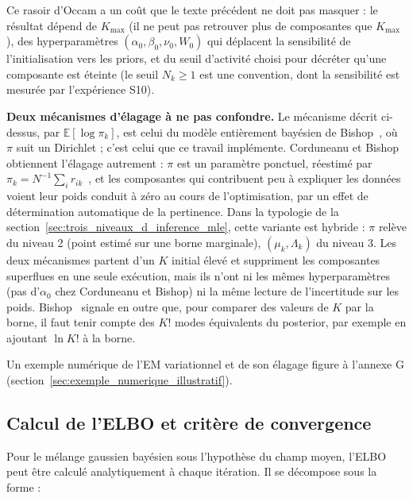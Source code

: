 Ce rasoir d'Occam a un coût que le texte précédent ne doit pas masquer : le résultat dépend de $K_{\max}$ (il ne peut pas retrouver plus de composantes que $K_{\max}$), des hyperparamètres $(\alpha_0, \beta_0, \nu_0, W_0)$ qui déplacent la sensibilité de l'initialisation vers les priors, et du seuil d'activité choisi pour décréter qu'une composante est éteinte (le seuil $N_k \geq 1$ est une convention, dont la sensibilité est mesurée par l'expérience S10).

\textbf{Deux mécanismes d'élagage à ne pas confondre. }Le mécanisme décrit ci-dessus, par $\mathbb{E}[\log \pi_k]$, est celui du modèle entièrement bayésien de Bishop~\cite[section~10.2]{bishop2006}, où $\pi$ suit un Dirichlet ; c'est celui que ce travail implémente. Corduneanu et Bishop~\cite{corduneanu2001} obtiennent l'élagage autrement : $\pi$ est un paramètre ponctuel, réestimé par $\pi_k = N^{-1}\sum_i r_{ik}$~\cite[éq.~10.83]{bishop2006}, et les composantes qui contribuent peu à expliquer les données voient leur poids conduit à zéro au cours de l'optimisation, par un effet de détermination automatique de la pertinence. Dans la typologie de la section~\ref{sec:trois_niveaux_d_inference_mle}, cette variante est hybride : $\pi$ relève du niveau 2 (point estimé sur une borne marginale), $(\mu_k, \Lambda_k)$ du niveau 3. Les deux mécanismes partent d'un $K$ initial élevé et suppriment les composantes superflues en une seule exécution, mais ils n'ont ni les mêmes hyperparamètres (pas d'$\alpha_0$ chez Corduneanu et Bishop) ni la même lecture de l'incertitude sur les poids. Bishop~\cite[section~10.2.4]{bishop2006} signale en outre que, pour comparer des valeurs de $K$ par la borne, il faut tenir compte des $K!$ modes équivalents du posterior, par exemple en ajoutant $\ln K!$ à la borne.

Un exemple numérique de l'EM variationnel et de son élagage figure à l'annexe G (section~\ref{sec:exemple_numerique_illustratif}).

\subsection{Calcul de l'ELBO et critère de convergence}\label{sec:calcul_elbo}
Pour le mélange gaussien bayésien sous l'hypothèse du champ moyen, l'ELBO peut être calculé analytiquement à chaque itération. Il se décompose sous la forme :


